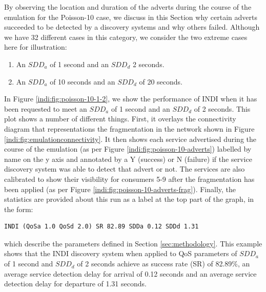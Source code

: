 By observing the location and duration of the adverts during the course of the emulation for the Poisson-10 case, we discuss in this Section why certain adverts succeeded to be detected by a discovery systems and why others failed. Although we have 32 different cases in this category, we consider the two extreme cases here for illustration:

\begin{enumerate}
\item An  $SDD_{a}$ of 1 second and an $SDD_{d}$ 2 seconds.
\item An $SDD_{a}$ of 10 seconds and an $SDD_{d}$ of 20  seconds.
\end{enumerate}

In Figure \ref{indi:fig:poisson-10-1-2}, we show the performance of INDI when it has been requested to meet an $SDD_{a}$ of 1 second and an $SDD_{d}$ of 2 seconds. This plot shows a number of different things.   First, it overlays the connectivity diagram that representations the fragmentation in the network shown  in Figure \ref{indi:fig:emulationconnectivity}.  It then shows each service advertised during the course of the emulation (as per Figure \ref{indi:fig:poisson-10-adverts}) labelled by name on the y axis and annotated by a Y (success) or N (failure) if the service discovery system was able to detect that advert or not.   The services are also calibrated to show their visibility for consumers 5-9 after the fragmentation has been applied (as per Figure \ref{indi:fig:poisson-10-adverts-frag}). Finally, the statistics are provided about this run as a label at the top part of the graph, in the form:

\begin{verbatim}
INDI (QoSa 1.0 QoSd 2.0) SR 82.89 SDDa 0.12 SDDd 1.31
\end{verbatim}


\noindent which describe the parameters defined in Section \ref{sec:methodology}. This example shows that the INDI discovery system when applied to QoS parameters of $SDD_{a}$ of 1 second and $SDD_{d}$ of 2 seconds achieve as success rate (SR) of 82.89\%, an average service detection delay for arrival of 0.12 seconds and an average service detection delay for departure of 1.31 seconds.   

